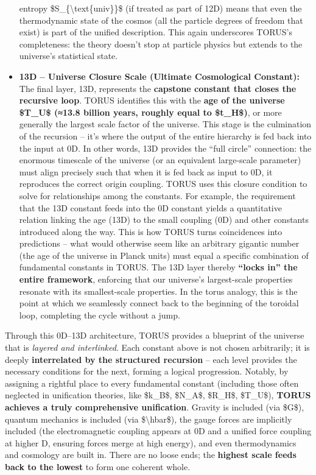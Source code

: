 \begin{itemize}
  entropy \$S\_\{\textbackslash{}text\{univ\}\}\$ (if treated as part of
  12D) means that even the thermodynamic state of the cosmos (all the
  particle degrees of freedom that exist) is part of the unified
  description. This again underscores TORUS's completeness: the theory
  doesn't stop at particle physics but extends to the universe's
  statistical state.
\item
  \textbf{13D -- Universe Closure Scale (Ultimate Cosmological
  Constant):} The final layer, 13D, represents the \textbf{capstone
  constant that closes the recursive loop}. TORUS identifies this with
  the \textbf{age of the universe \$T\_U\$ (≈13.8 billion years, roughly
  equal to \$t\_H\$)}​, or more generally the largest scale factor of
  the universe. This stage is the culmination of the recursion -- it's
  where the output of the entire hierarchy is fed back into the input at
  0D. In other words, 13D provides the ``full circle'' connection: the
  enormous timescale of the universe (or an equivalent large-scale
  parameter) must align precisely such that when it is fed back as input
  to 0D, it reproduces the correct origin coupling. TORUS uses this
  closure condition to solve for relationships among the constants. For
  example, the requirement that the 13D constant feeds into the 0D
  constant yields a quantitative relation linking the age (13D) to the
  small coupling (0D) and other constants introduced along the way​.
  This is how TORUS turns coincidences into predictions -- what would
  otherwise seem like an arbitrary gigantic number (the age of the
  universe in Planck units) must equal a specific combination of
  fundamental constants in TORUS. The 13D layer thereby \textbf{``locks
  in'' the entire framework}, enforcing that our universe's
  largest-scale properties resonate with its smallest-scale properties.
  In the torus analogy, this is the point at which we seamlessly connect
  back to the beginning of the toroidal loop, completing the cycle
  without a jump.
\end{itemize}

Through this 0D--13D architecture, TORUS provides a blueprint of the
universe that is \emph{layered and interlinked}. Each constant above is
not chosen arbitrarily; it is deeply \textbf{interrelated by the
structured recursion} -- each level provides the necessary conditions
for the next, forming a logical progression. Notably, by assigning a
rightful place to every fundamental constant (including those often
neglected in unification theories, like \$k\_B\$, \$N\_A\$, \$R\_H\$,
\$T\_U\$), \textbf{TORUS achieves a truly comprehensive unification}​.
Gravity is included (via \$G\$), quantum mechanics is included (via
\$\textbackslash{}hbar\$), the gauge forces are implicitly included (the
electromagnetic coupling appears at 0D and a unified force coupling at
higher D, ensuring forces merge at high energy), and even thermodynamics
and cosmology are built in. There are no loose ends; the \textbf{highest
scale feeds back to the lowest} to form one coherent whole​.

